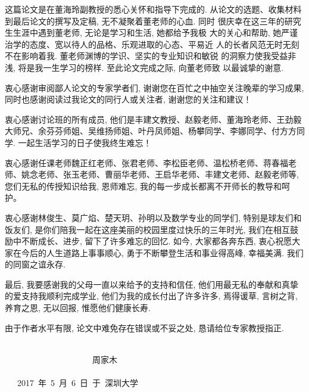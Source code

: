 ﻿
\begin{thanks}

这篇论文是在董海玲副教授的悉心关怀和指导下完成的. 从论文的选题、收集材料到最后论文的撰写及定稿, 无不凝聚着董老师的心血. 同时
很庆幸在这三年的研究生生涯中遇到董老师, 无论是学习和生活, 她都给予我极
大的关心和帮助, 她严谨治学的态度、宽以待人的品格、乐观进取的心态、平易近
人的长者风范无时无刻不在影响着我. 董老师渊博的学识、坚实的专业知识和敏锐
的洞察力使我受益非浅, 将是我一生学习的榜样. 至此论文完成之际, 向董老师致
以最诚挚的谢意.

衷心感谢审阅鄙人论文的专家学者们, 谢谢您在百忙之中抽空关注晚辈的学习成果, 同时也感谢阅读过我论文的同行人或关注者, 谢谢您的关注和建议！

衷心感谢讨论班的所有成员, 他们是丰建文教授、赵毅老师、董海玲老师、王劲毅大师兄、余芬芬师姐、吴维扬师姐、叶丹凤师姐、杨攀同学、李娜同学、付方方同学.
一起生活学习的日子使我终生难忘！

衷心感谢任课老师魏正红老师、张君老师、李松臣老师、温松桥老师、蒋春福老师、姚念老师、张玉老师、曹丽华老师、王启华老师、丰建文老师、赵毅老师等, 您们无私的传授知识给我, 恩师难忘, 我的每一步成长都离不开师长的教导和呵护。

衷心感谢林俊生、莫广焰、楚天玥、孙明以及数学专业的同学们, 特别是球友们和饭友们, 是你们陪我一起在这座美丽的校园里度过快乐的三年时光, 我们在相互鼓励中不断成长、进步, 留下了许多难忘的回忆. 如今, 大家都各奔东西, 衷心祝愿大家在今后的人生道路上事事顺心, 勇于不断攀登生活和事业得高峰, 幸福美满. 我们的同窗之谊永存.




最后, 我要感谢我的父母一直以来给予的支持和信任, 他们用最无私的奉献和真挚的爱支持我顺利完成学业, 他们为我的成长付出了许多许多, 焉得谖草, 言树之背, 养育之恩, 无以回报, 惟愿他们健康长寿.

由于作者水平有限, 论文中难免存在错误或不妥之处, 恳请给位专家教授指正.

\vskip 18pt
~~~~~~~~~~~~~~~~~~~~~~~~~~~~~~~~~~~~~~~~~~~~~~~~~~~~~~~~~~~~~~~~~~~~~~~~~~~~~~~~~~~~~~~~~~~~~周家木
\vskip 10pt
~~~~~~~~~~~~~~~~~~~~~~~~~~~~~~~~~~~~~~~~~~~~~~~~~~~~~~~~~~~~~~~~~~~~~~~~~~~2017~年~5~月~6~日~于~深圳大学

\end{thanks}
